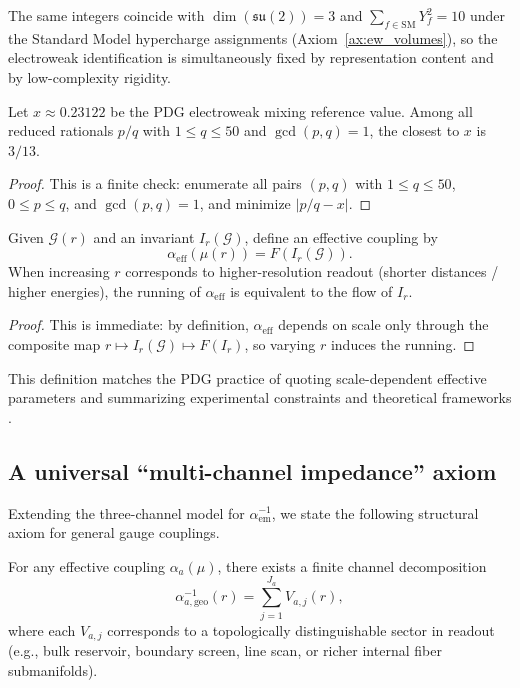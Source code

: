 The same integers coincide with $\dim(\mathfrak{su}(2))=3$ and $\sum_{f\in\mathrm{SM}} Y_f^2=10$ under the Standard Model hypercharge assignments (Axiom~\ref{ax:ew_volumes}), so the electroweak identification is simultaneously fixed by representation content and by low-complexity rigidity.

\begin{proposition}\label{prop:weinberg_rational_rigidity}
Let $x\approx 0.23122$ be the PDG electroweak mixing reference value. Among all reduced rationals $p/q$ with $1\le q\le 50$ and $\gcd(p,q)=1$, the closest to $x$ is $3/13$.
\end{proposition}
\begin{proof}
This is a finite check: enumerate all pairs $(p,q)$ with $1\le q\le 50$, $0\le p\le q$, and $\gcd(p,q)=1$, and minimize $|p/q-x|$.
\end{proof}

\begin{proposition}
\label{prop:running_couplings}
Given $\mathcal{G}(r)$ and an invariant $I_r(\mathcal{G})$, define an effective coupling by
\begin{equation}
\alpha_{\mathrm{eff}}(\mu(r)) = F\!\left(I_r(\mathcal{G})\right).
\end{equation}
When increasing $r$ corresponds to higher-resolution readout (shorter distances / higher energies), the running of $\alpha_{\mathrm{eff}}$ is equivalent to the flow of $I_r$.
\end{proposition}
\begin{proof}
This is immediate: by definition, $\alpha_{\mathrm{eff}}$ depends on scale only through the composite map $r\mapsto I_r(\mathcal{G})\mapsto F(I_r)$, so varying $r$ induces the running.
\end{proof}

This definition matches the PDG practice of quoting scale-dependent effective parameters and summarizing experimental constraints and theoretical frameworks \cite{PDGRPP2024}.

\subsection{A universal ``multi-channel impedance'' axiom}
Extending the three-channel model for $\alpha_{\mathrm{em}}^{-1}$, we state the following structural axiom for general gauge couplings.

\begin{axiom}
\label{ax:multi_channel}
For any effective coupling $\alpha_a(\mu)$, there exists a finite channel decomposition
\begin{equation}
\alpha_{a,\mathrm{geo}}^{-1}(r)=\sum_{j=1}^{J_a} V_{a,j}(r),
\end{equation}
where each $V_{a,j}$ corresponds to a topologically distinguishable sector in readout (e.g., bulk reservoir, boundary screen, line scan, or richer internal fiber submanifolds).
\end{axiom}

